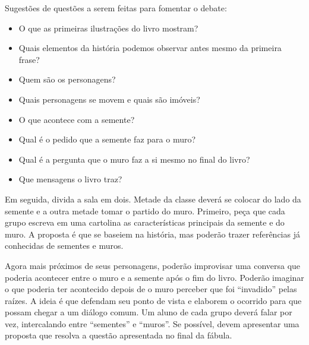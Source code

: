 \documentclass[11pt]{extarticle}
\begin{document}

Sugestões de questões a serem feitas para fomentar o debate:

\begin{itemize}

\item O que as primeiras ilustrações do livro mostram?

\item Quais elementos da história podemos observar antes mesmo da primeira frase?

\item Quem são os personagens?

\item Quais personagens se movem e quais são imóveis?

\item O que acontece com a semente?

\item Qual é o pedido que a semente faz para o muro?

\item Qual é a pergunta que o muro faz a si mesmo no final do livro?

\item Que mensagens o livro traz?

\end{itemize}

Em seguida, divida a sala em dois. Metade da classe deverá se colocar do lado da semente e a outra metade tomar o partido do muro. Primeiro, peça que cada grupo escreva em uma cartolina as características principais da semente e do muro. A proposta é que se baseiem na história, mas poderão trazer referências já conhecidas de sementes e muros.



Agora mais próximos de seus personagens, poderão improvisar uma conversa que poderia acontecer entre o muro e a semente após o fim do livro. Poderão imaginar o que poderia ter acontecido depois de o muro perceber que foi ``invadido'' pelas raízes. A ideia é que defendam seu ponto de vista e elaborem o ocorrido para que possam chegar a um diálogo comum. Um aluno de cada grupo deverá falar por vez, intercalando entre ``sementes'' e ``muros''. Se possível, devem apresentar uma proposta que resolva a questão apresentada no final da fábula.
\end{document}
